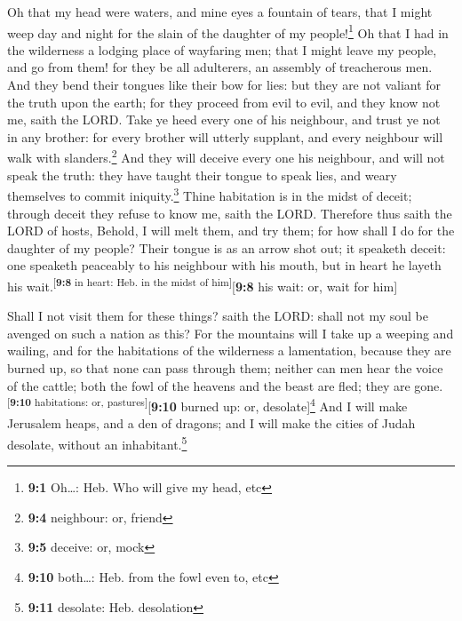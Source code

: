  Oh that my head were waters, and mine eyes a fountain of
tears, that I might weep day and night for the slain of the daughter of
my people!\footnote{\textbf{9:1} Oh\ldots: Heb. Who will give my head,
  etc}  Oh that I had in the wilderness a lodging place of
wayfaring men; that I might leave my people, and go from them! for they
be all adulterers, an assembly of treacherous men.  And
they bend their tongues like their bow for lies: but they are not
valiant for the truth upon the earth; for they proceed from evil to
evil, and they know not me, saith the LORD.  Take ye heed
every one of his neighbour, and trust ye not in any brother: for every
brother will utterly supplant, and every neighbour will walk with
slanders.\footnote{\textbf{9:4} neighbour: or, friend} 
And they will deceive every one his neighbour, and will not speak the
truth: they have taught their tongue to speak lies, and weary themselves
to commit iniquity.\footnote{\textbf{9:5} deceive: or, mock}
 Thine habitation is in the midst of deceit; through
deceit they refuse to know me, saith the LORD.  Therefore
thus saith the LORD of hosts, Behold, I will melt them, and try them;
for how shall I do for the daughter of my people?  Their
tongue is as an arrow shot out; it speaketh deceit: one speaketh
peaceably to his neighbour with his mouth, but in heart he layeth his
wait.\textsuperscript{{[}\textbf{9:8} in heart: Heb. in the midst of
him{]}}{[}\textbf{9:8} his wait: or, wait for him{]}

 Shall I not visit them for these things? saith the LORD:
shall not my soul be avenged on such a nation as this? 
For the mountains will I take up a weeping and wailing, and for the
habitations of the wilderness a lamentation, because they are burned up,
so that none can pass through them; neither can men hear the voice of
the cattle; both the fowl of the heavens and the beast are fled; they
are gone.\textsuperscript{{[}\textbf{9:10} habitations: or,
pastures{]}}{[}\textbf{9:10} burned up: or, desolate{]}\footnote{\textbf{9:10}
  both\ldots: Heb. from the fowl even to, etc}  And I
will make Jerusalem heaps, and a den of dragons; and I will make the
cities of Judah desolate, without an inhabitant.\footnote{\textbf{9:11}
  desolate: Heb. desolation}

